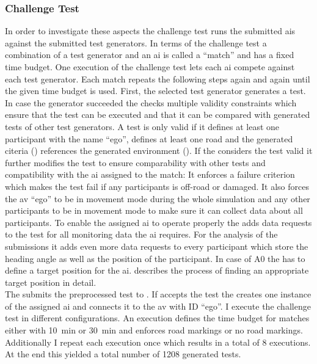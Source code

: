 \subsubsection{Challenge Test}
In order to investigate these aspects the challenge test runs the submitted \glspl{ai} against the submitted test generators.
In terms of the challenge test a combination of a test generator and an \gls{ai} is called a \enquote{match} and has a fixed time budget.
One execution of the challenge test lets each \gls{ai} compete against each test generator.
Each match repeats the following steps again and again until the given time budget is used.
First, the selected test generator generates a test.
In case the generator succeeded the \submissiontester{} checks multiple validity constraints which ensure that the test can be executed and that it can be compared with generated tests of other test generators.
A test is only valid if it defines at least one participant with the name \enquote{ego}, defines at least one road and the generated citeria () references the generated environment ().
If the \submissiontester{} considers the test valid it further modifies the test to ensure comparability with other tests and compatibility with the \gls{ai} assigned to the match:
It enforces a failure criterion which makes the test fail if any participants is off-road or damaged.
It also forces the \gls{av} \enquote{ego} to be in movement mode \mmautonomous{} during the whole simulation and any other participants to be in movement mode \mmtraining{} to make sure it can collect data about all participants.
To enable the assigned \gls{ai} to operate properly the \submissiontester{} adds data requests to the test for all monitoring data the \gls{ai} requires.
For the analysis of the submissions it adds even more data requests to every participant which store the heading angle as well as the position of the participant.
In case of A0 the \submissiontester{} has to define a target position for the \gls{ai}.
 describes the process of finding an appropriate target position in detail.\\
The \submissiontester{} submits the preprocessed test to \drivebuild{}.
If \drivebuild{} accepts the test the \submissiontester{} creates one instance of the assigned \gls{ai} and connects it to the \gls{av} with ID \enquote{ego}.
I execute the challenge test in different configurations.
An execution defines the time budget for matches either with \SI{10}{\minute} or \SI{30}{\minute} and enforces road markings or no road markings.
Additionally I repeat each execution once which results in a total of \num{8} executions.
At the end this yielded a total number of \num{1208} generated tests.
